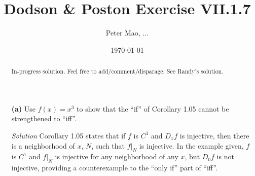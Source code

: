 \documentclass[11pt]{article}
\title{Dodson \& Poston Exercise VII.1.7}
\author{Peter Mao, $\ldots$}
\date{\today}
\begin{document}
\maketitle
\pagestyle{empty}

\begin{abstract}
  In-progress solution.  Feel free to add/comment/disparage.  See Randy's solution.
\end{abstract}



\begin{itemize}
\item[\textbf{(a)}] Use $f(x) = x^3$ to show that the ``if'' of Corollary 1.05
  cannot be strengthened to ``iff''.
\item[\emph{Solution}] Corollary 1.05 states that if $f$ is $C^1$ and $D_xf$ is
  injective, then there is a neighborhood of $x$, $N$, such that $f|_N$ is
  injective.  In the example given, $f$ is $C^1$ and $f|_N$ is injective for any
  neighborhood of any $x$, but $D_0f$ is not injective, providing a
  counterexample to the ``only if'' part of ``iff''.
  


\end{itemize}
\end{document}
